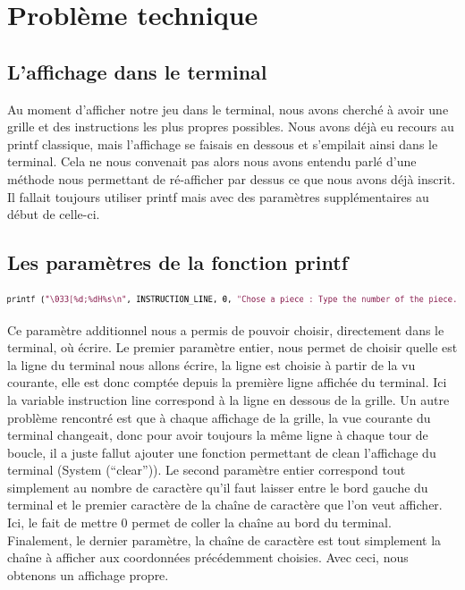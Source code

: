 \documentclass{article}
\begin{document}
\section {Problème technique}
\subsection {L'affichage dans le terminal}
Au moment d'afficher notre jeu dans le terminal, nous avons cherché à avoir une grille et des instructions les plus propres possibles. Nous avons déjà eu recours au printf classique, mais l'affichage se faisais en dessous et s'empilait ainsi dans le terminal. Cela ne nous convenait pas alors nous avons entendu parlé d'une méthode nous permettant de ré-afficher par dessus ce que nous avons déjà inscrit. Il fallait toujours utiliser printf mais avec des paramètres supplémentaires au début de celle-ci.
\subsection {Les paramètres de la fonction printf}

\begin{flushleft}
\includegraphics[scale=0.45]{printf_capture.png}
\end{flushleft}

Ce paramètre additionnel nous a permis de pouvoir choisir, directement dans le terminal, où écrire. Le premier paramètre entier, nous permet de choisir quelle est la ligne du terminal nous allons écrire, la ligne est choisie à partir de la vu courante, elle est donc comptée depuis la première ligne affichée du terminal. Ici la variable instruction line correspond à la ligne en dessous de la grille. Un autre problème rencontré est que à chaque affichage de la grille, la vue courante du terminal changeait, donc pour avoir toujours la même ligne à chaque tour de boucle, il a juste fallut ajouter une fonction permettant de clean l'affichage du terminal (System (``clear'')).
Le second paramètre entier correspond tout simplement au nombre de caractère qu'il faut laisser entre le bord gauche du terminal et le premier caractère de la chaîne de caractère que l'on veut afficher. Ici, le fait de mettre 0 permet de coller la chaîne au bord du terminal.
Finalement, le dernier paramètre, la chaîne de caractère est tout simplement la chaîne à afficher aux coordonnées précédemment choisies. Avec ceci, nous obtenons un affichage propre.
\end{document}
